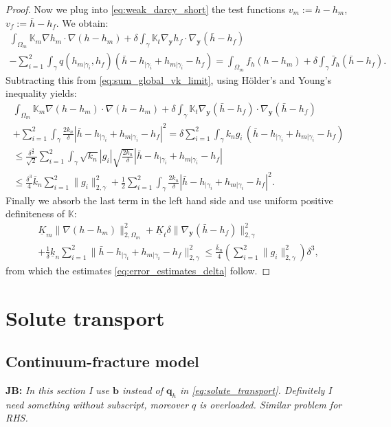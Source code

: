 \documentclass[a4paper]{article}
\def\vc#1{\mathbf{\boldsymbol{#1}}}     %
\def\tn#1{{\mathbb{#1}}}    %
\def\norm#1{\|#1\|}
\def\yy{{\vc y}}
\newcommand{\note}[2]{{\color{blue} \textbf{ #1:} \textit{#2}}}
\begin{document}
\begin{proof}
Now we plug into \eqref{eq:weak_darcy_short} the test functions $v_m:=h-h_m$, $v_f:=\bar h-h_f$.
We obtain:
\begin{multline*}
\int_{\Omega_m}\tn K_m\nabla h_m\cdot\nabla(h-h_m) + \delta\int_\gamma\tn K_t\nabla_\yy h_f\cdot\nabla_\yy(\bar h-h_f)\\
- \sum_{i=1}^2\int_\gamma q(h_{m|\gamma_i},h_f)(\bar h - h_{|\gamma_i}+h_{m|\gamma_i} - h_f)
= \int_{\Omega_m} f_h(h-h_m)
+ \delta\int_\gamma\bar f_h(\bar h-h_f).
\end{multline*}
Subtracting this from \eqref{eq:sum_global_vk_limit}, using H\"older's and Young's inequality yields:
\begin{multline}
\int_{\Omega_m}\tn K_m\nabla (h-h_m)\cdot\nabla(h-h_m)
+\delta\int_\gamma\tn K_t\nabla_\yy(\bar h-h_f)\cdot\nabla_\yy(\bar h-h_f)\\
+ \sum_{i=1}^2\int_\gamma \frac{2k_n}\delta |\bar h - h_{|\gamma_i} + h_{m|\gamma_i} - h_f|^2
= \delta\sum_{i=1}^2\int_\gamma k_n g_i\, (\bar h - h_{|\gamma_i} + h_{m|\gamma_i} - h_f)\\
\le \frac{\delta^{\frac32}}{\sqrt2}\sum_{i=1}^2\int_\gamma \sqrt{k_n}|g_i|\sqrt{\frac{2k_n}\delta}|\bar h - h_{|\gamma_i} + h_{m|\gamma_i} - h_f|\\
\le \frac{\delta^3}4\overline k_n\sum_{i=1}^2\norm{g_i}_{2,\gamma}^2 + \frac12\sum_{i=1}^2\int_\gamma \frac{2k_n}\delta |\bar h - h_{|\gamma_i} + h_{m|\gamma_i} - h_f|^2.
\end{multline}
Finally we absorb the last term in the left hand side and use uniform positive definiteness of $\tn K$:
\begin{multline}
\underline K_m\norm{\nabla (h-h_m)}_{2,\Omega_m}^2
+\underline K_t\delta\norm{\nabla_\yy(\bar h-h_f)}_{2,\gamma}^2\\
+ \frac1\delta\underline k_n\sum_{i=1}^2\norm{\bar h - h_{|\gamma_i} + h_{m|\gamma_i} - h_f}_{2,\gamma}^2
\le \frac{\overline k_n}4\left(\sum_{i=1}^2\norm{g_i}_{2,\gamma}^2\right)\delta^3,
\end{multline}
from which the estimates \eqref{eq:error_estimates_delta} follow.
\end{proof}

\section{Solute transport}
\subsection{Continuum-fracture model}
\note{JB}{In this section I use $\vc b$ instead of $\vc q_h$ in \eqref{eq:solute_transport}. Definitely I need something without subscript, moreover $q$ is overloaded.
Similar problem for RHS.}
\end{document}
